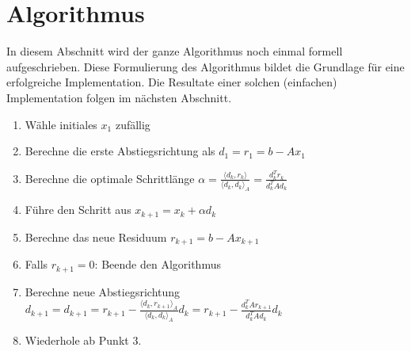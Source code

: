 \section{Algorithmus\label{cg:section:algorithmus}}

In diesem Abschnitt wird der ganze Algorithmus noch einmal formell aufgeschrieben.
Diese Formulierung des Algorithmus bildet die Grundlage für eine erfolgreiche Implementation.
Die Resultate einer solchen (einfachen) Implementation folgen im nächsten Abschnitt.

\begin{enumerate}
	\item Wähle initiales $x_1$ zufällig
	\item Berechne die erste Abstiegsrichtung als $d_1 = r_1 =  b-Ax_1$
	\item Berechne die optimale Schrittlänge  $ \alpha	= 	\displaystyle  \frac{\langle d_k , r_k \rangle}{\langle d_k , d_k \rangle_A} 
																			= \frac{d_k^T  r_k}{d_k^T A d_k }$
	\item Führe den Schritt aus $x_{k+1} = x_k + \alpha d_k$
	\item Berechne das neue Residuum $r_{k+1} = b-Ax_{k+1}$
	\item Falls $r_{k+1} = 0$: Beende den Algorithmus
	\item Berechne neue Abstiegsrichtung $d_{k+1} = d_{k+1}	= 	r_{k+1} - \displaystyle \frac{\langle d_k , r_{k+1} \rangle_A}{\langle d_k , d_k \rangle_A} d_k 
															= r_{k+1} - \displaystyle \frac{d_k^T A r_{k+1}}{d_k^T A d_k} d_k $
	\item Wiederhole ab Punkt 3.
\end{enumerate}
